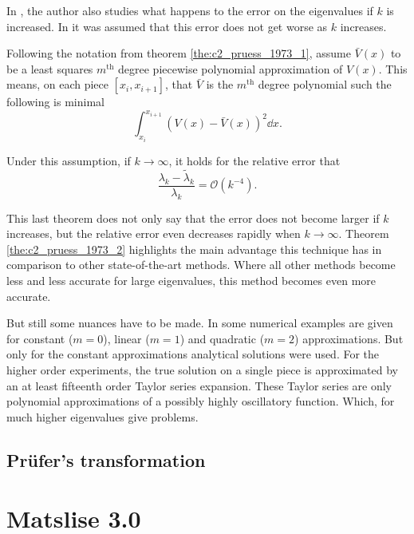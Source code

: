 In \cite{pruess_estimating_1973}, the author also studies what happens to the error on the eigenvalues if $k$ is increased. In \cite{canosa_new_1970} it was assumed that this error does not get worse as $k$ increases.

\begin{theorem}[Pruess 1973]\label{the:c2_pruess_1973_2}
    Following the notation from theorem \ref{the:c2_pruess_1973_1}, assume $\bar{V}(x)$ to be a least squares $m^\text{th}$ degree piecewise polynomial approximation of $V(x)$. This means, on each piece $[x_i, x_{i+1}]$, that $\bar{V}$ is the $m^\text{th}$ degree polynomial such the following is minimal
    $$
    \int_{x_i}^{x_{i+1}} \left(V(x) - \bar{V}(x)\right)^2 \dd x \text{.}
    $$
    
    Under this assumption, if $k \to \infty$, it holds for the relative error that
    $$
    \frac{\lambda_k - \tilde{\lambda}_k}{\lambda_k} = \mathcal{O}(k^{-4})\text{.}
    $$
\end{theorem}

This last theorem does not only say that the error does not become larger if $k$ increases, but the relative error even decreases rapidly when $k \to \infty$. Theorem \ref{the:c2_pruess_1973_2} highlights the main advantage this technique has in comparison to other state-of-the-art methods. Where all other methods become less and less accurate for large eigenvalues, this method becomes even more accurate.

But still some nuances have to be made. In \cite{pruess_estimating_1973} some numerical examples are given for constant ($m=0$), linear ($m=1$) and quadratic ($m=2$) approximations. But only for the constant approximations analytical solutions were used. For the higher order experiments, the true solution on a single piece is approximated by an at least fifteenth order Taylor series expansion. These Taylor series are only polynomial approximations of a possibly highly oscillatory function. Which, for much higher eigenvalues give problems.


\subsection{Prüfer's transformation}

\section{Matslise 3.0}


